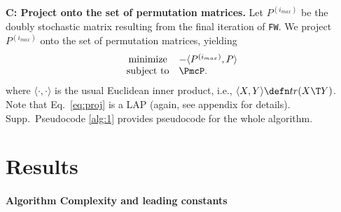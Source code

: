 \documentclass{article} %
\begin{document}
\textbf{C: Project onto the set of permutation matrices.}   Let $P^{(i_{max})}$ be the doubly stochastic matrix resulting from the final iteration of \texttt{FW}.  We project $P^{(i_{max})}$ onto the set of permutation matrices, yielding
\begin{equation}
\begin{array}{cl}
			\text{minimize}   & -\langle P^{(i_{max})}, P \rangle \\
			\text{subject to}  & \PmcP.   
\end{array} \label{eq:proj}
\end{equation}
where $\langle \cdot,\cdot \rangle$ %
is the usual Euclidean inner product, i.e., $\langle X,Y\rangle \defn tr(X\T Y)$.  Note that Eq.~\eqref{eq:proj} is a LAP (again, see appendix for details). Supp.\  Pseudocode \ref{alg:1} provides pseudocode for the whole algorithm.  


\vspace{-5pt}
\section{Results} %
\label{sec:results}
\vspace{-5pt}





\paragraph{Algorithm Complexity and leading constants} %
\label{sub:const}
\end{document}

